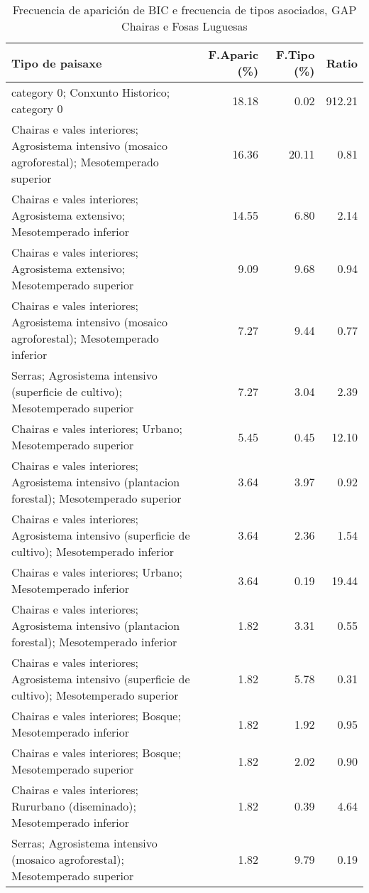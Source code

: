 \begin{table}[p]
\centering
\caption{Frecuencia de aparición de BIC e frecuencia de tipos asociados, GAP Chairas e Fosas Luguesas} 
\label{vbic6}
\begin{tabular}{lrrr}
  \hline
Tipo de paisaxe & F.Aparic (\%) & F.Tipo (\%) & Ratio \\ 
  \hline
category 0; Conxunto Historico; category 0 & 18.18 & 0.02 & 912.21 \\ 
  Chairas e vales interiores; Agrosistema intensivo (mosaico agroforestal); Mesotemperado superior & 16.36 & 20.11 & 0.81 \\ 
  Chairas e vales interiores; Agrosistema extensivo; Mesotemperado inferior & 14.55 & 6.80 & 2.14 \\ 
  Chairas e vales interiores; Agrosistema extensivo; Mesotemperado superior & 9.09 & 9.68 & 0.94 \\ 
  Chairas e vales interiores; Agrosistema intensivo (mosaico agroforestal); Mesotemperado inferior & 7.27 & 9.44 & 0.77 \\ 
  Serras; Agrosistema intensivo (superficie de cultivo); Mesotemperado superior & 7.27 & 3.04 & 2.39 \\ 
  Chairas e vales interiores; Urbano; Mesotemperado superior & 5.45 & 0.45 & 12.10 \\ 
  Chairas e vales interiores; Agrosistema intensivo (plantacion forestal); Mesotemperado superior & 3.64 & 3.97 & 0.92 \\ 
  Chairas e vales interiores; Agrosistema intensivo (superficie de cultivo); Mesotemperado inferior & 3.64 & 2.36 & 1.54 \\ 
  Chairas e vales interiores; Urbano; Mesotemperado inferior & 3.64 & 0.19 & 19.44 \\ 
  Chairas e vales interiores; Agrosistema intensivo (plantacion forestal); Mesotemperado inferior & 1.82 & 3.31 & 0.55 \\ 
  Chairas e vales interiores; Agrosistema intensivo (superficie de cultivo); Mesotemperado superior & 1.82 & 5.78 & 0.31 \\ 
  Chairas e vales interiores; Bosque; Mesotemperado inferior & 1.82 & 1.92 & 0.95 \\ 
  Chairas e vales interiores; Bosque; Mesotemperado superior & 1.82 & 2.02 & 0.90 \\ 
  Chairas e vales interiores; Rururbano (diseminado); Mesotemperado inferior & 1.82 & 0.39 & 4.64 \\ 
  Serras; Agrosistema intensivo (mosaico agroforestal); Mesotemperado superior & 1.82 & 9.79 & 0.19 \\ 
   \hline
\end{tabular}
\end{table}
